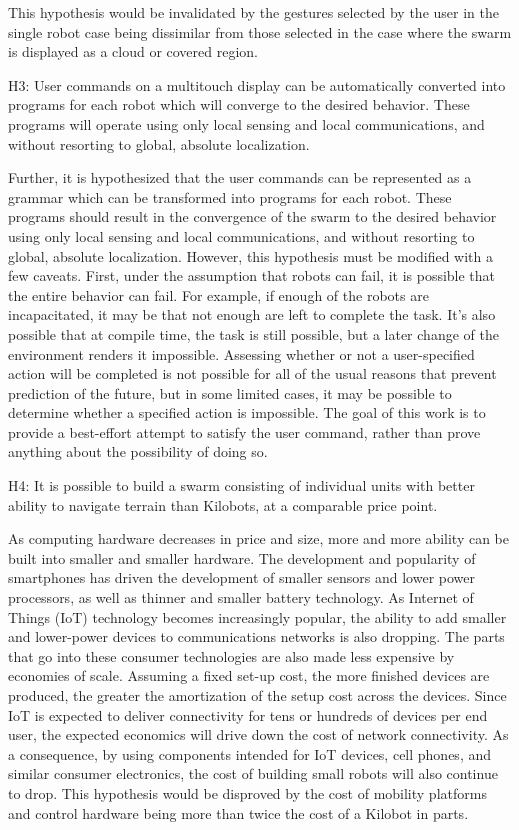 This hypothesis would be invalidated by the gestures selected by the user in the single robot case being dissimilar from those selected in the case where the swarm is displayed as a cloud or covered region. 

H3: User commands on a multitouch display can be automatically converted into programs for each robot which will converge to the desired behavior. These programs will operate using only local sensing and local communications, and without resorting to global, absolute localization. 

Further, it is hypothesized that the user commands can be represented as a grammar which can be transformed into programs for each robot. 
These programs should result in the convergence of the swarm to the desired behavior using only local sensing and local communications, and without resorting to global, absolute localization. 
However, this hypothesis must be modified with a few caveats. 
First, under the assumption that robots can fail, it is possible that the entire behavior can fail. 
For example, if enough of the robots are incapacitated, it may be that not enough are left to complete the task. 
It's also possible that at compile time, the task is still possible, but a later change of the environment renders it impossible. 
Assessing whether or not a user-specified action will be completed is not possible for all of the usual reasons that prevent prediction of the future, but in some limited cases, it may be possible to determine whether a specified action is impossible. The goal of this work is to provide a best-effort attempt to satisfy the user command, rather than prove anything about the possibility of doing so. 

H4: It is possible to build a swarm consisting of individual units with better ability to navigate terrain than Kilobots, at a comparable price point. 

As computing hardware decreases in price and size, more and more ability can be built into smaller and smaller hardware. 
The development and popularity of smartphones has driven the development of smaller sensors and lower power processors, as well as thinner and smaller battery technology. 
As Internet of Things (IoT) technology becomes increasingly popular, the ability to add smaller and lower-power devices to communications networks is also dropping. 
The parts that go into these consumer technologies are also made less expensive by economies of scale. 
Assuming a fixed set-up cost, the more finished devices are produced, the greater the amortization of the setup cost across the devices. 
Since IoT is expected to deliver connectivity for tens or hundreds of devices per end user, the expected economics will drive down the cost of network connectivity.
As a consequence, by using components intended for IoT devices, cell phones, and similar consumer electronics, the cost of building small robots will also continue to drop.
This hypothesis would be disproved by the cost of mobility platforms and control hardware being more than twice the cost of a Kilobot in parts. 
